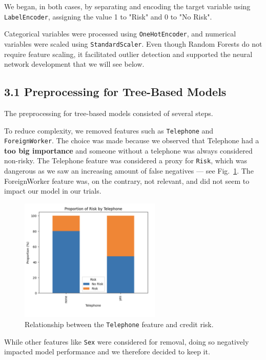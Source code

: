 \documentclass[12pt]{report}
\begin{document}
We began, in both cases, by separating and encoding the target variable using \texttt{LabelEncoder}, assigning the value 1 to "Risk" and 0 to "No Risk".

Categorical variables were processed using \texttt{OneHotEncoder}, and numerical variables were scaled using \texttt{StandardScaler}. Even though Random Forests do not require feature scaling, it facilitated outlier detection and supported the neural network development that we will see below.

\subsection*{3.1 Preprocessing for Tree-Based Models}

The preprocessing for tree-based models consisted of several steps.

To reduce complexity, we removed features such as \texttt{Telephone} and \texttt{ForeignWorker}. The choice was made because we observed that Telephone had a \textbf{too big importance} and someone without a telephone was always considered non-risky. The Telephone feature was considered a proxy for \texttt{Risk}, which was dangerous as we saw an increasing amount of false negatives — see Fig.~\ref{fig:risk_telephone}. The ForeignWorker feature was, on the contrary, not relevant, and did not seem to impact our model in our trials. 

\begin{figure}[h!]
    \centering
    \includegraphics[width=0.6\textwidth]{risk_telephone.png}
    \caption{Relationship between the \texttt{Telephone} feature and credit risk.}
    \label{fig:risk_telephone}
\end{figure}

While other features like \texttt{Sex} were considered for removal, doing so negatively impacted model performance and we therefore decided to keep it.
\end{document}
